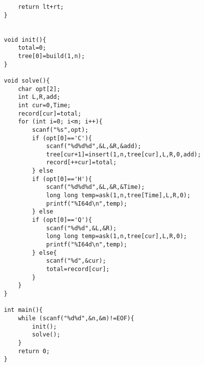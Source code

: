 \begin{verbatim}
    return lt+rt;
}


void init(){
    total=0;
    tree[0]=build(1,n);
}

void solve(){
    char opt[2];
    int L,R,add;
    int cur=0,Time;
    record[cur]=total;
    for (int i=0; i<m; i++){
        scanf("%s",opt);
        if (opt[0]=='C'){
            scanf("%d%d%d",&L,&R,&add);
            tree[cur+1]=insert(1,n,tree[cur],L,R,0,add);
            record[++cur]=total;
        } else
        if (opt[0]=='H'){
            scanf("%d%d%d",&L,&R,&Time);
            long long temp=ask(1,n,tree[Time],L,R,0);
            printf("%I64d\n",temp);
        } else
        if (opt[0]=='Q'){
            scanf("%d%d",&L,&R);
            long long temp=ask(1,n,tree[cur],L,R,0);
            printf("%I64d\n",temp);
        } else{
            scanf("%d",&cur);
            total=record[cur];
        }
    }
}

int main(){
    while (scanf("%d%d",&n,&m)!=EOF){
        init();
        solve();
    }
    return 0;
}
\end{verbatim}
